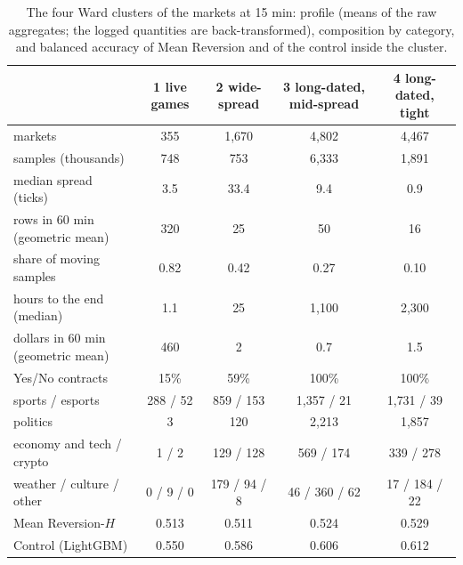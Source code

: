 \begin{table}[t]
\centering
\caption{The four Ward clusters of the markets at 15 min: profile (means of the raw
aggregates; the logged quantities are back-transformed), composition by category, and
balanced accuracy of Mean Reversion and of the control inside the cluster.}
\label{tab:structure:clusters}
\small
\begin{fittable}\begin{tabular}{lcccc}
\toprule
& 1 live games & 2 wide-spread & 3 long-dated, mid-spread & 4 long-dated, tight \\
\midrule
markets                           & 355    & 1{,}670 & 4{,}802 & 4{,}467 \\
samples (thousands)               & 748    & 753     & 6{,}333 & 1{,}891 \\
median spread (ticks)             & 3.5    & 33.4    & 9.4     & 0.9 \\
rows in 60 min (geometric mean)   & 320    & 25      & 50      & 16 \\
share of moving samples           & 0.82   & 0.42    & 0.27    & 0.10 \\
hours to the end (median)         & 1.1    & 25      & 1{,}100 & 2{,}300 \\
dollars in 60 min (geometric mean)& 460    & 2       & 0.7     & 1.5 \\
Yes/No contracts                  & 15\%   & 59\%    & 100\%   & 100\% \\
\midrule
sports / esports                  & 288 / 52 & 859 / 153 & 1{,}357 / 21 & 1{,}731 / 39 \\
politics                          & 3      & 120     & 2{,}213 & 1{,}857 \\
economy and tech / crypto         & 1 / 2  & 129 / 128 & 569 / 174 & 339 / 278 \\
weather / culture / other         & 0 / 9 / 0 & 179 / 94 / 8 & 46 / 360 / 62 & 17 / 184 / 22 \\
\midrule
Mean Reversion-$H$                & 0.513  & 0.511   & 0.524   & 0.529 \\
Control (LightGBM)                & 0.550  & 0.586   & 0.606   & 0.612 \\
\bottomrule
\end{tabular}\end{fittable}
\end{table}

